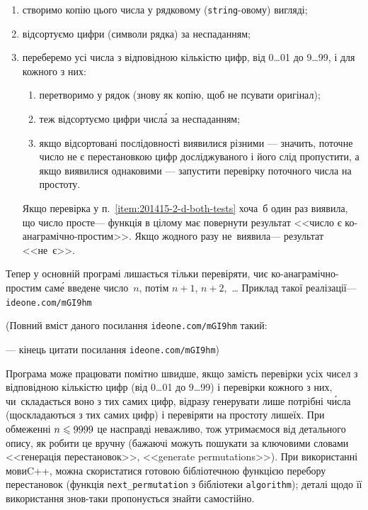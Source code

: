 \documentclass[14pt,a4paper]{extarticle}
\renewcommand{\baselinestretch}{1.3125}
\begin{document}
\begin{enumerate}
\item
створимо копію цього числа у рядковому (\texttt{string}-овому) вигляді;
\item
відсортуємо цифри (символи рядка) за неспаданням;
\item
переберемо усі числа з відповідною кількістю цифр, від 0\dots01 до 9\dots99, і для кожного з них:
\begin{enumerate}
\item
перетворимо у рядок (знову як копію, щоб не псувати оригінал);
\item
теж відсортуємо цифри числ\'{а} за неспаданням;
\item \label{item:201415-2-d-both-tests}
якщо відсортовані послідовності виявилися різними --- значить, поточне число не є перестановкою цифр досліджуваного і його слід пропустити, а якщо виявилися однаковими --- запустити перевірку поточного числа на простоту.
\end{enumerate}
Якщо перевірка у п.~\ref{item:201415-2-d-both-tests} хоча~б один раз виявила, що число просте\nolinebreak[3] --- функція в цілому має повернути результат <<число є ко-ана\-гра\-мічно-простим>>. Якщо жодного разу не~виявила\nolinebreak[3] --- результат <<не~є>>.
\end{enumerate}

Тепер у основній програмі лишається тільки перевіряти, чи\nolinebreak[3] є ко-ана\-гра\-мічно-простим сам\'{е} введене число~$n$, потім $n{+}1$, $n{+}2$,~\dots{} Приклад такої реалізації\nolinebreak[3] --- 
\verb"ideone.com/mGI9hm"


{\color{green}\begin{small}

\renewcommand{\baselinestretch}{0.875}

(Повний вміст даного посилання \verb"ideone.com/mGI9hm" такий:

--- кінець цитати посилання \verb"ideone.com/mGI9hm")

\end{small}}




Програма може працювати помітно швидше, якщо замість перевірки усіх чисел з відповідною кількістю цифр (від 0\dots01 до 9\dots99) і перевірки кожного з них, чи~складається воно з тих самих цифр, відразу генерувати лише потрібні ч\'{и}сла (що\nolinebreak[3] складаються з тих самих цифр) і перевіряти на простоту лише\nolinebreak[3] їх. При обмеженні $n\leqslant9999$ це насправді неважливо, тож утримаємося від детального опису, як робити це вручну (бажаючі можуть пошукати за ключовими словами <<генерація перестановок>>, <<generate permutations>>). При використанні мови\nolinebreak[2] C++, можна скористатися готовою бібліотечною функцією перебору перестановок (функція \verb"next_permutation" з бібліотеки \verb"algorithm"); деталі щодо її використання знов-таки пропонується знайти самостійно.
\end{document}
